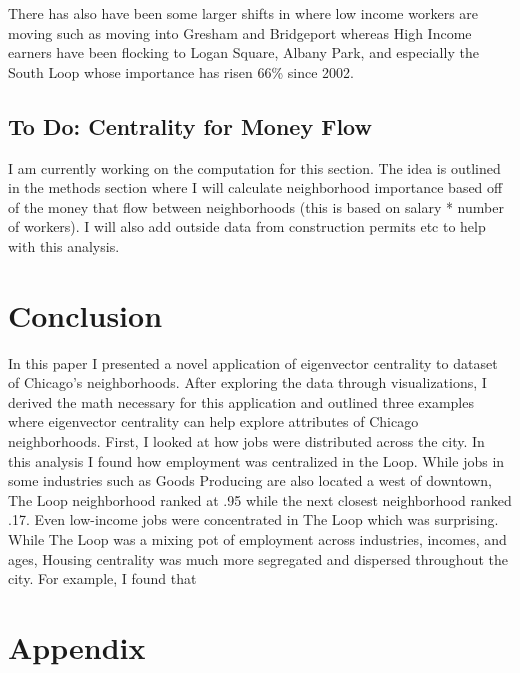 \documentclass{article}
\theoremstyle{definition}
\theoremstyle{remark}
\begin{document}
There has also have been some larger shifts in where low income workers are moving such as moving into Gresham and Bridgeport whereas High Income earners have been flocking to Logan Square, Albany Park, and especially the South Loop whose importance has risen 66\% since 2002.
\subsection{To Do: Centrality for Money Flow}
I am currently working on the computation for this section.  The idea is outlined in the methods section where I will calculate neighborhood importance based off of the money that flow between neighborhoods (this is based on salary * number of workers).  I will also add outside data from construction permits etc to help with this analysis.\cite{gould1967geographical}
\section{Conclusion}
In this paper I presented a novel application of eigenvector centrality to dataset of Chicago's neighborhoods.  After exploring the data through visualizations, I derived the math necessary for this application and outlined three examples where eigenvector centrality can help explore attributes of Chicago neighborhoods.  First, I looked at how jobs were distributed across the city.  In this analysis I found how employment was centralized in the Loop.  While jobs in some industries such as Goods Producing are also located a west of downtown, The Loop neighborhood ranked at .95 while the next closest neighborhood ranked .17.  Even low-income jobs were concentrated in The Loop which was surprising.  While The Loop was a mixing pot of employment across industries, incomes, and ages, Housing centrality was much more segregated and dispersed throughout the city.  For example, I found that 

\section{Appendix}
\end{document}
